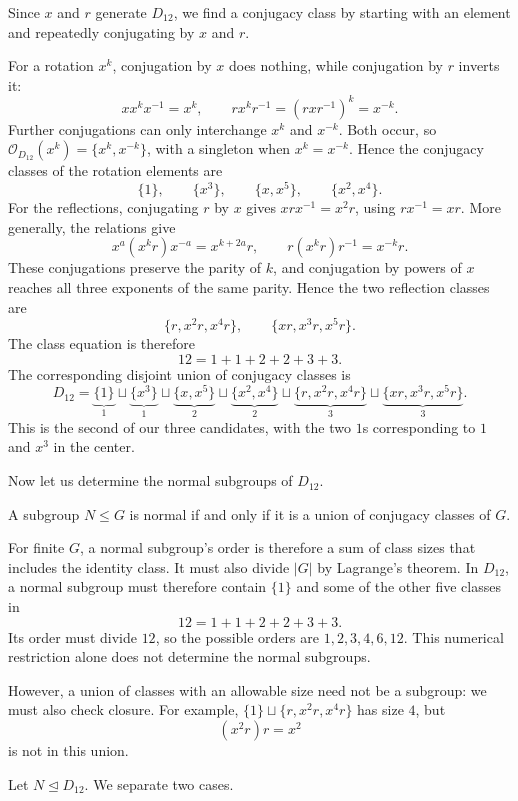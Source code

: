 \documentclass[reqno,11pt]{amsart}
\begin{document}
Since $x$ and $r$ generate $D_{12}$, we find a conjugacy class by starting with an element and
repeatedly conjugating by $x$ and $r$.

For a rotation $x^k$, conjugation by $x$ does nothing, while
conjugation by $r$ inverts it:
\[
  x x^k x^{-1}=x^k,\qquad
  r x^k r^{-1}=(rxr^{-1})^k=x^{-k}.
\]
Further conjugations can only interchange $x^k$ and $x^{-k}$.
Both occur, so $\mathcal{O}_{D_{12}}(x^k)=\{x^k,x^{-k}\}$, with a
singleton when $x^k=x^{-k}$. Hence the conjugacy classes of the
rotation elements are
\[
  \{1\},\qquad \{x^3\},\qquad
  \{x,x^5\},\qquad \{x^2,x^4\}.
\]
For the reflections, conjugating $r$ by $x$ gives
$xrx^{-1}=x^2r$, using $rx^{-1}=xr$. More generally, the relations give
\[
  x^a(x^kr)x^{-a}=x^{k+2a}r,\qquad
  r(x^kr)r^{-1}=x^{-k}r.
\]
These conjugations preserve the parity of $k$, and conjugation by
powers of $x$ reaches all three exponents of the same parity.
Hence the two reflection classes are
\[
  \{r,x^2r,x^4r\},\qquad \{xr,x^3r,x^5r\}.
\]
The class equation is therefore
\[
  12=1+1+2+2+3+3.
\]
The corresponding disjoint union of conjugacy classes is
\[
  D_{12}
  =\underbrace{\{1\}}_{1}
  \sqcup\underbrace{\{x^3\}}_{1}
  \sqcup\underbrace{\{x,x^5\}}_{2}
  \sqcup\underbrace{\{x^2,x^4\}}_{2}
  \sqcup\underbrace{\{r,x^2r,x^4r\}}_{3}
  \sqcup\underbrace{\{xr,x^3r,x^5r\}}_{3}.
\]
This is the second of our three candidates, with the two $1$s
corresponding to $1$ and $x^3$ in the center.

Now let us determine the normal subgroups of $D_{12}$.

\begin{proposition}\label{prop:normal-union}
A subgroup $N\leq G$ is normal if and only if it is a union of
conjugacy classes of $G$.
\end{proposition}

For finite $G$, a normal subgroup's order is therefore a sum of
class sizes that includes the identity class. It must also divide
$|G|$ by Lagrange's theorem. In $D_{12}$, a normal subgroup must
therefore contain $\{1\}$
and some of the other five classes in
\[
  12=1+1+2+2+3+3.
\]
Its order must divide $12$, so the possible orders are
$1,2,3,4,6,12$. This numerical restriction alone does not determine
the normal subgroups.

However, a union of classes with an allowable
size need not be a subgroup: we must also check closure.
For example, $\{1\}\sqcup\{r,x^2r,x^4r\}$ has size $4$, but
\[
  (x^2r)r=x^2
\]
is not in this union.

Let $N\trianglelefteq D_{12}$. We separate two cases.
\end{document}
